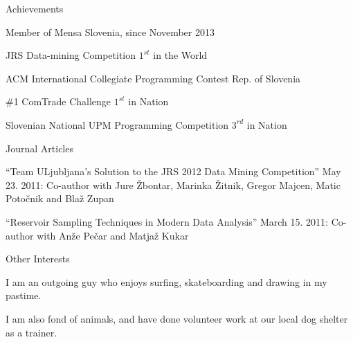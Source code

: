 \documentclass{resume} %
\begin{document}
\begin{rSection}{}


\begin{aSubsection}{Achievements}
\item Member of Mensa Slovenia, since November 2013
\item JRS Data-mining Competition \hfill $1^{st}$ in the World
\item ACM International Collegiate Programming Contest \hfill Rep. of Slovenia
\item \#1 ComTrade Challenge \hfill $1^{st}$ in Nation
\item Slovenian National UPM Programming Competition \hfill $3^{rd}$ in Nation
\end{aSubsection}



\begin{aSubsection}{Journal Articles}
\item ``Team ULjubljana’s Solution to the JRS 2012 Data Mining Competition'' May 23. 2011: Co-author with Jure \v{Z}bontar, Marinka \v{Z}itnik, Gregor Majcen, Matic Poto\v{c}nik and Bla\v{z} Zupan
\item ``Reservoir Sampling Techniques in Modern Data Analysis'' March 15. 2011: Co-author with An\v{z}e Pe\v{c}ar and Matja\v{z} Kukar
\end{aSubsection}



\begin{aSubsection}{Other Interests}
\item I am an outgoing guy who enjoys surfing, skateboarding and drawing in my pastime. 
\item I am also fond of animals, and have done volunteer work at our local dog shelter as a trainer.
\end{aSubsection}






\end{rSection}

\end{document}
